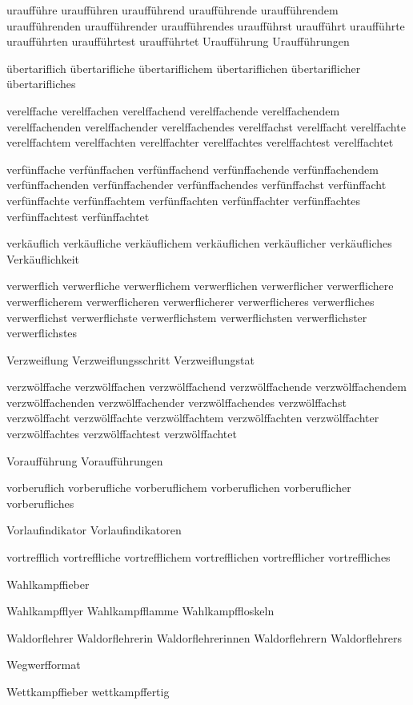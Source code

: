 uraufführe uraufführen uraufführend uraufführende uraufführendem uraufführenden uraufführender uraufführendes uraufführst uraufführt uraufführte uraufführten uraufführtest uraufführtet Uraufführung Uraufführungen

übertariflich übertarifliche übertariflichem übertariflichen übertariflicher übertarifliches

verelffache verelffachen verelffachend verelffachende verelffachendem verelffachenden verelffachender verelffachendes verelffachst verelffacht verelffachte verelffachtem verelffachten verelffachter verelffachtes verelffachtest verelffachtet

verfünffache verfünffachen verfünffachend verfünffachende verfünffachendem verfünffachenden verfünffachender verfünffachendes verfünffachst verfünffacht verfünffachte verfünffachtem verfünffachten verfünffachter verfünffachtes verfünffachtest verfünffachtet

verkäuflich verkäufliche verkäuflichem verkäuflichen verkäuflicher verkäufliches Verkäuflichkeit

verwerflich verwerfliche verwerflichem verwerflichen verwerflicher verwerflichere verwerflicherem verwerflicheren verwerflicherer verwerflicheres verwerfliches verwerflichst verwerflichste verwerflichstem verwerflichsten verwerflichster verwerflichstes

Verzweiflung Verzweiflungsschritt Verzweiflungstat

verzwölffache verzwölffachen verzwölffachend verzwölffachende verzwölffachendem verzwölffachenden verzwölffachender verzwölffachendes verzwölffachst verzwölffacht verzwölffachte verzwölffachtem verzwölffachten verzwölffachter verzwölffachtes verzwölffachtest verzwölffachtet

Voraufführung Voraufführungen

vorberuflich vorberufliche vorberuflichem vorberuflichen vorberuflicher vorberufliches

Vorlaufindikator Vorlaufindikatoren

vortrefflich vortreffliche vortrefflichem vortrefflichen vortrefflicher vortreffliches

Wahlkampffieber 

Wahlkampfflyer Wahlkampfflamme Wahlkampffloskeln 

Waldorflehrer Waldorflehrerin Waldorflehrerinnen Waldorflehrern Waldorflehrers

Wegwerfformat

Wettkampffieber wettkampffertig

